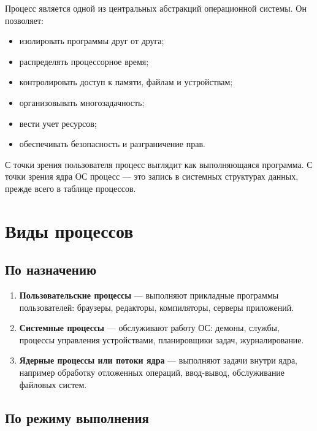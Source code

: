 \documentclass[12pt,a4paper]{article}
\begin{document}
Процесс является одной из центральных абстракций операционной системы. Он позволяет:
\begin{itemize}
    \item изолировать программы друг от друга;
    \item распределять процессорное время;
    \item контролировать доступ к памяти, файлам и устройствам;
    \item организовывать многозадачность;
    \item вести учет ресурсов;
    \item обеспечивать безопасность и разграничение прав.
\end{itemize}

С точки зрения пользователя процесс выглядит как выполняющаяся программа. С точки зрения ядра ОС процесс --- это запись в системных структурах данных, прежде всего в таблице процессов.

\section{Виды процессов}

\subsection{По назначению}

\begin{enumerate}
    \item \textbf{Пользовательские процессы} --- выполняют прикладные программы пользователей: браузеры, редакторы, компиляторы, серверы приложений.
    \item \textbf{Системные процессы} --- обслуживают работу ОС: демоны, службы, процессы управления устройствами, планировщики задач, журналирование.
    \item \textbf{Ядерные процессы или потоки ядра} --- выполняют задачи внутри ядра, например обработку отложенных операций, ввод-вывод, обслуживание файловых систем.
\end{enumerate}

\subsection{По режиму выполнения}
\end{document}

